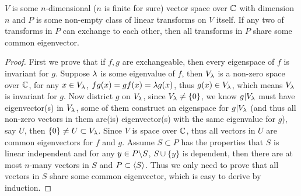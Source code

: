 \begin{pro}%
	$V$ is some $n$-dimensional ($n$ is finite for sure) vector space over $\mathbb{C}$ with dimension $n$ and $P$ is some non-empty class of linear transforms on $V$ itself. If any two of transforms in $P$ can exchange to each other, then all transforms in $P$ share some common eigenvector.
\end{pro}
\begin{proof}
	First we prove that if $f,g$ are exchangeable, then every eigenspace of $f$ is invariant for $g$. Suppose $\lambda$ is some eigenvalue of $f$, then $V_{\lambda}$ is a non-zero space over $\mathbb{C}$, for any $x\in V_{\lambda}$, $fg(x)=gf(x)=\lambda g(x)$, thus $g(x)\in V_{\lambda}$, which means $V_{\lambda}$ is invariant for $g$. Now district $g$  on $V_{\lambda}$, since $V_{\lambda}\neq \{0\}$, we know $g|V_{\lambda}$ must have eigenvector(s) in $V_{\lambda}$, some of them construct an eigenspace for $g|V_{\lambda}$ (and thus all non-zero vectors in them are(is) eigenvector(s) with the same eigenvalue for $g$), say $U$, then $\{0\}\neq U\subset V_{\lambda}$. Since $V$ is space over $\mathbb{C}$, thus all vectors in $U$ are common eigenvectors for $f$ and $g$. Assume $S\subset P$ has the properties that $S$ is linear independent and for any $y\in P\backslash S$, $S\cup\{y\}$ is dependent, then there are at most $n$-many vectors in $S$ and $P\subset\left\langle S\right\rangle$. Thus we only need to prove that all vectors in $S$ share some common eigenvector, which is easy to derive by induction.
\end{proof}